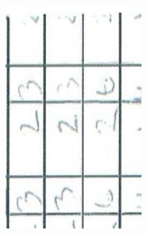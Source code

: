 \documentclass[10pt]{article}
\begin{document}
\includegraphics[max width=\textwidth, center]{2025_02_27_dd68c3d38de88f0516d9g-019(4)}\\
\end{document}
